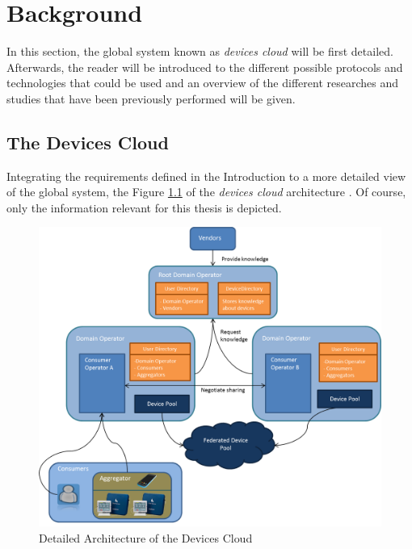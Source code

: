 \chapter{Background}
\label{cha:relatedwork}

In this section, the global system known as \emph{devices cloud} will be first detailed. Afterwards, the reader will be introduced to the different possible protocols and technologies that could be used and an overview of the different researches and studies that have been previously performed will be given.
 
\section{The Devices Cloud}
Integrating the requirements defined in the Introduction to a more detailed view of the global system, the Figure \ref{fig:design_complete} of the \emph{devices cloud} architecture . Of course, only the information relevant for this thesis is depicted.

\begin{figure}[!ht]
	\centering
	\includegraphics[scale=0.3]{images/design_complete}
	\caption{Detailed Architecture of the Devices Cloud}
	\label{fig:design_complete}
\end{figure}

